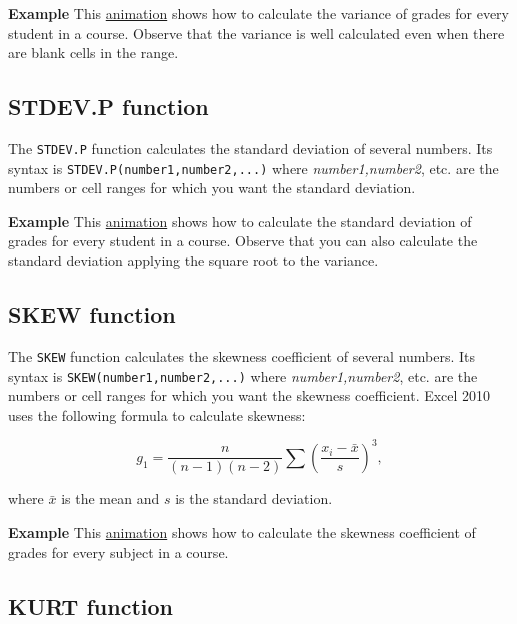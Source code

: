 \textbf{Example} This \href{http://aprendeconalf.es/office/excel/manual/img/example_function_varp.gif}{animation} shows how to calculate the variance of grades for every student in a course. Observe that the variance is well calculated even when there are blank cells in the range.

\subsection{STDEV.P function}\hypertarget{stdevp-function}{}\label{stdevp-function}

The \texttt{STDEV.P} function calculates the standard deviation of several numbers. Its syntax is \texttt{STDEV.P(number1,number2,...)} where \emph{number1,number2}, etc. are the numbers or cell ranges for which you want the standard deviation.

\textbf{Example} This \href{http://aprendeconalf.es/office/excel/manual/img/example_function_stdevp.gif}{animation} shows how to calculate the standard deviation of grades for every student in a course. Observe that you can also calculate the standard deviation applying the square root to the variance.

\subsection{SKEW function}\hypertarget{skew-function}{}\label{skew-function}

The \texttt{SKEW} function calculates the skewness coefficient of several numbers. Its syntax is \texttt{SKEW(number1,number2,...)} where \emph{number1,number2}, etc. are the numbers or cell ranges for which you want the skewness coefficient. Excel 2010 uses the following formula to calculate skewness:

\begin{displaymath}
g_1=\frac{n}{(n-1)(n-2)}\sum \left(\frac{x_i-\bar x}{s}\right)^3,
\end{displaymath}

where $\bar x$ is the mean and $s$ is the standard deviation.

\textbf{Example} This \href{http://aprendeconalf.es/office/excel/manual/img/example_function_skew.gif}{animation} shows how to calculate the skewness coefficient of grades for every subject in a course.

\subsection{KURT function}\hypertarget{kurt-function}{}\label{kurt-function}

